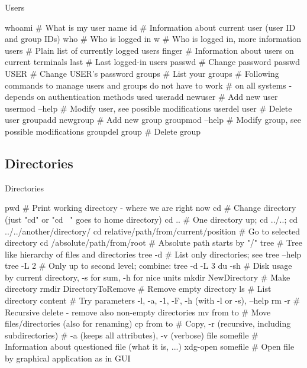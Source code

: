 \documentclass[compress, ucs, xelatex, 11pt, xcolor=svgnames,
  hyperref={
    bookmarks=true,
    unicode=true,
    colorlinks=true,
    pdftitle={Linux, command line and MetaCentrum},
    plainpages=false,
    pdfauthor={Vojtech Zeisek},
    pdfsubject={Course about use of Linux command line, writing shell scripts and using MetaCentrum of CESNET},
    pdfcreator={XeLaTeX},
    pdfkeywords={Linux, GNU, BASH, shell, command line, MetaCentrum},
    linkcolor=DarkRed,
    anchorcolor=DarkBlue,
    citecolor=Indigo,
    filecolor=NavyBlue,
    menucolor=DarkMagenta,
    urlcolor=DarkBlue,
    pdftex},
  url={hyphens, lowtilde} %
  ]{beamer}
\begin{document}
\begin{frame}[fragile]{Users}
  \begin{bashcode}
    whoami # What is my user name
    id # Information about current user (user ID and group IDs)
    who # Who is logged in
    w # Who is logged in, more information
    users # Plain list of currently logged users
    finger # Information about users on current terminals
    last # Last logged-in users
    passwd # Change password
    passwd USER # Change USER's password
    groups # List your groups
    # Following commands to manage users and groups do not have to work
    # on all systems - depends on authentication methods used
    useradd newuser # Add new user
    usermod --help # Modify user, see possible modifications
    userdel user # Delete user
    groupadd newgroup # Add new group
    groupmod --help # Modify group, see possible modifications
    groupdel group # Delete group
  \end{bashcode}
\end{frame}

\subsection{Directories}

\begin{frame}[fragile]{Directories}
  \begin{bashcode}
    pwd # Print working directory - where we are right now
    cd # Change directory (just "cd" or "cd ~" goes to home directory)
    cd .. # One directory up; cd ../..; cd ../../another/directory/
    cd relative/path/from/current/position # Go to selected directory
    cd /absolute/path/from/root # Absolute path starts by "/"
    tree # Tree like hierarchy of files and directories
    tree -d # List only directories; see tree --help
    tree -L 2 # Only up to second level; combine: tree -d -L 3
    du -sh # Disk usage by current directory, -s for sum, -h for nice units
    mkdir NewDirectory # Make directory
    rmdir DirectoryToRemove # Remove empty directory
    ls # List directory content
       # Try parameters -l, -a, -1, -F, -h (with -l or -s), --help
    rm -r # Recursive delete - remove also non-empty directories
    mv from to # Move files/directories (also for renaming)
    cp from to # Copy, -r (recursive, including subdirectories)
               # -a (keeps all attributes), -v (verbose)
    file somefile # Information about questioned file (what it is, ...)
    xdg-open somefile # Open file by graphical application as in GUI
  \end{bashcode}
\end{frame}
\end{document}
